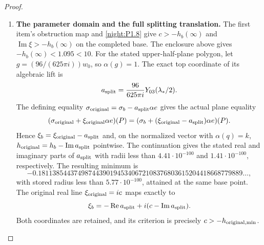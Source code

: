 \begin{proof}
\begin{enumerate}[label=\arabic*.]
\[ \tag{1.18.6}
\]
Put $y_0=\log100/(2\pi)$ and $t=y-y_0\ge0$.
The four coefficients of
$\det(tI_3+y_0I_3+B(q))$, in increasing degree, have the
uniform lower bounds
\[
 1.9918,\qquad4.9602,\qquad3.9580,\qquad1,
\]
with the last coefficient exactly one. Thus the determinant is
positive on the punctured inner disc.
In the actual real $J$ coordinates, a graph vector $(Zv,v)$
is real precisely when $v$ is real and $(\operatorname{Im}Z)v=0$.
The determinant therefore proves transversality of the
$c_*$ plane there. By the first item's exact obstruction map,
$h_b-h_b(\infty)$ never vanishes. The punctured disc is connected,
and at $q=1/100$ the certified value
$h_b=-0.4504422009074\ldots$ is greater than $h_b(\infty)$.
Consequently $h_b>h_b(\infty)$ throughout this disc.

For completeness these same graph maps prove the cusp limit.
The lower block of $e_J$ vanishes, so $L$ is independent of a
real parameter $c$, and $C_c$ is holomorphic at zero and affine
in $c$. For any fixed real bound $M$, it is uniformly bounded
on a smaller closed disc and the compact interval between
$c_*$ and $-M$. As $y\to\infty$, the Neumann inverse makes
$yI+\operatorname{Im}C_c$ invertible uniformly on that interval.
The real quantity $h_b+c$ cannot cross zero along it. Its sign
at $c_*$ is positive, so $h_b-M>0$ at the other endpoint.
This proves $h_b\to+\infty$ at the cusp. The covers and the
strict local estimate now prove the global minimum and its
uniqueness.

\item \textbf{The parameter domain and the full splitting translation.}
The first item's obstruction map and \cref{night:P1.8} give
$c>-h_b(\infty)$ and $\operatorname{Im}\xi>-h_b(\infty)$
on the completed base. The enclosure above gives
$-h_b(\infty)<1.095<10$.
For the stated upper-half-plane polygon, let
$g=(96/(625\pi i))w_0$, so $\alpha(g)=1$.
The exact top coordinate of its algebraic lift is
\[
 a_{\rm split}=\frac{96}{625\pi i}Y_{03}(\lambda_*/2).
\]
The defining equality
$\sigma_{\rm original}=\sigma_b-a_{\rm split}\alpha e$
gives the actual plane equality
\[
 (\sigma_{\rm original}+\xi_{\rm original}\alpha e)(P)
  =(\sigma_b+(\xi_{\rm original}-a_{\rm split})\alpha e)(P).
\]
Hence $\xi_b=\xi_{\rm original}-a_{\rm split}$ and, on the
normalized vector with $\alpha(q)=k$,
$h_{\rm original}=h_b-\operatorname{Im}a_{\rm split}$ pointwise.
The continuation gives the stated real and imaginary parts of
$a_{\rm split}$ with radii less than $4.41\cdot10^{-100}$ and
$1.41\cdot10^{-100}$, respectively. The resulting minimum is
\[
 -0.181138544374987443901945340672108376803615204418668779889\ldots,
\]
with stored radius less than $5.77\cdot10^{-100}$, attained
at the same base point. The original real line
$\xi_{\rm original}=ic$ maps exactly to
\[
 \xi_b=-\operatorname{Re}a_{\rm split}
          +i(c-\operatorname{Im}a_{\rm split}).
\]
Both coordinates are retained, and its criterion is precisely
$c>-h_{{\rm original},\min}$.


\end{enumerate}
\end{proof}
